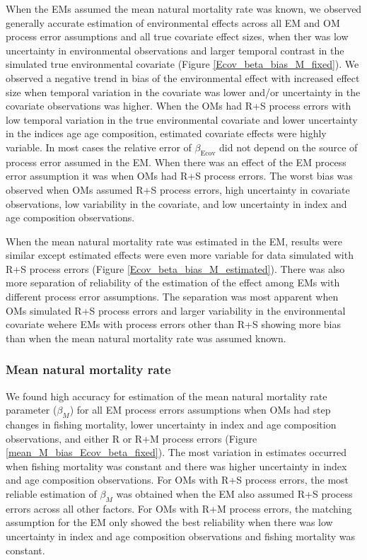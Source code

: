 \documentclass[
  12pt,
]{article}
\begin{document}
When the EMs assumed the mean natural mortality rate was known, we observed generally accurate estimation of environmental effects across all EM and OM process error assumptions and all true covariate effect sizes, when ther was low uncertainty in environmental observations and larger temporal contrast in the simulated true environmental covariate (Figure \ref{Ecov_beta_bias_M_fixed}). We observed a negative trend in bias of the environmental effect with increased effect size when temporal variation in the covariate was lower and/or uncertainty in the covariate observations was higher. When the OMs had R+S process errors with low temporal variation in the true environmental covariate and lower uncertainty in the indices age age composition, estimated covariate effects were highly variable. In most cases the relative error of \(\beta_\text{Ecov}\) did not depend on the source of process error assumed in the EM. When there was an effect of the EM process error assumption it was when OMs had R+S process errors. The worst bias was observed when OMs assumed R+S process errors, high uncertainty in covariate observations, low variability in the covariate, and low uncertainty in index and age composition observations.

When the mean natural mortality rate was estimated in the EM, results were similar except estimated effects were even more variable for data simulated with R+S process errors (Figure \ref{Ecov_beta_bias_M_estimated}). There was also more separation of reliability of the estimation of the effect among EMs with different process error assumptions. The separation was most apparent when OMs simulated R+S process errors and larger variability in the environmental covariate wehere EMs with process errors other than R+S showing more bias than when the mean natural mortality rate was assumed known.

\hypertarget{mean-natural-mortality-rate}{%
\subsubsection*{Mean natural mortality rate}\label{mean-natural-mortality-rate}}

We found high accuracy for estimation of the mean natural mortality rate parameter (\(\beta_M\)) for all EM process errors assumptions when OMs had step changes in fishing mortality, lower uncertainty in index and age composition observations, and either R or R+M process errors (Figure \ref{mean_M_bias_Ecov_beta_fixed}). The most variation in estimates occurred when fishing mortality was constant and there was higher uncertainty in index and age composition observations. For OMs with R+S process errors, the most reliable estimation of \(\beta_M\) was obtained when the EM also assumed R+S process errors across all other factors. For OMs with R+M process errors, the matching assumption for the EM only showed the best reliability when there was low uncertainty in index and age composition observations and fishing mortality was constant.
\end{document}
